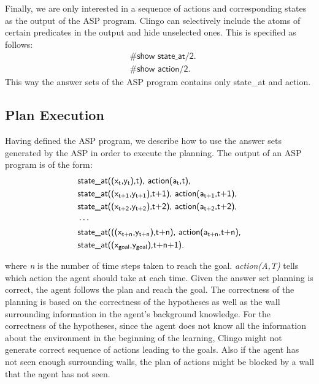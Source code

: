 Finally, we are only interested in a sequence of actions and corresponding states as the output of the ASP program. 
Clingo can selectively include the atoms of certain predicates in the output and hide unselected ones. 
This is specified as follows:
\begin{equation}
\begin{split}
&\textsf{\#show state\_at/2.} \\
&\textsf{\#show action/2.}
\end{split}
\end{equation}
This way the answer sets of the ASP program contains only \textsf{state\_at} and \textsf{action}.

\subsection{Plan Execution}
\label{subsec:plan_execution}
Having defined the ASP program, we describe how to use the answer sets generated by the ASP in order to execute the planning.
The output of an ASP program is of the form:
\begin{equation}
\begin{split}
&\textsf{state\_at((x\textsubscript{t},y\textsubscript{t}),t), action(a\textsubscript{t},t),}\\
&\textsf{state\_at((x\textsubscript{t+1},y\textsubscript{t+1}),t+1), action(a\textsubscript{t+1},t+1),}\\
&\textsf{state\_at((x\textsubscript{t+2},y\textsubscript{t+2}),t+2), action(a\textsubscript{t+2},t+2),}\\
&\cdots\\
&\textsf{state\_at(((x\textsubscript{t+n},y\textsubscript{t+n}),t+n), action(a\textsubscript{t+n},t+n),}\\
&\textsf{state\_at((x\textsubscript{goal},y\textsubscript{goal}),t+n+1).} 
\end{split}
\end{equation}

where \textit{n} is the number of time steps taken to reach the goal. 
\textit{action(A,T)} tells which action the agent should take at each time.
Given the answer set planning is correct, the agent follows the plan and reach the goal. 
The correctness of the planning is based on the correctness of the hypotheses as well as the wall surrounding information in the agent's background knowledge. 
For the correctness of the hypotheses, since the agent does not know all the information about the environment in the beginning of the learning,   
Clingo might not generate correct sequence of actions leading to the goals.
Also if the agent has not seen enough surrounding walls, the plan of actions might be blocked by a wall that the agent has not seen. 

